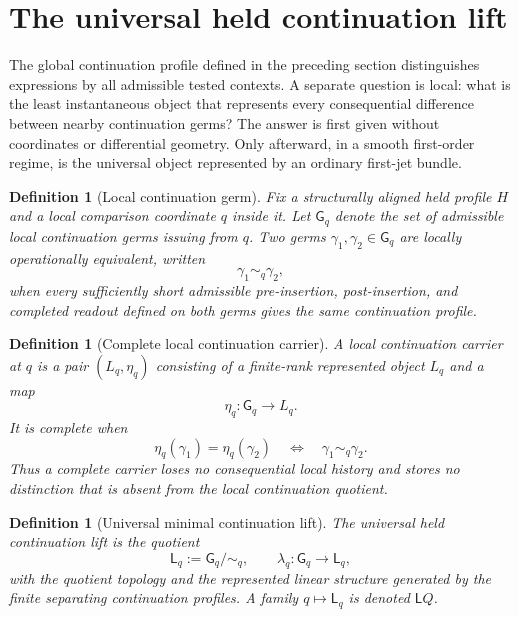 \documentclass[11pt]{article}
\newtheorem{definition}[theorem]{Definition}
\theoremstyle{remark}
\begin{document}
\section{The universal held continuation lift}\label{sec:local-continuation-closure}

The global continuation profile defined in the preceding section distinguishes expressions by all admissible tested contexts.  A separate question is local: what is the least instantaneous object that represents every consequential difference between nearby continuation germs?  The answer is first given without coordinates or differential geometry.  Only afterward, in a smooth first-order regime, is the universal object represented by an ordinary first-jet bundle.

\begin{definition}[Local continuation germ]
Fix a structurally aligned held profile $H$ and a local comparison coordinate $q$ inside it.  Let $\mathsf G_q$ denote the set of admissible local continuation germs issuing from $q$.  Two germs $\gamma_1,\gamma_2\in\mathsf G_q$ are locally operationally equivalent, written
\[
        \gamma_1\sim_q\gamma_2,
\]
when every sufficiently short admissible pre-insertion, post-insertion, and completed readout defined on both germs gives the same continuation profile.
\end{definition}

\begin{definition}[Complete local continuation carrier]
A \emph{local continuation carrier} at $q$ is a pair $(L_q,\eta_q)$ consisting of a finite-rank represented object $L_q$ and a map
\[
        \eta_q:\mathsf G_q\longrightarrow L_q.
\]
It is \emph{complete} when
\[
        \eta_q(\gamma_1)=\eta_q(\gamma_2)
        \quad\Longleftrightarrow\quad
        \gamma_1\sim_q\gamma_2.
\]
Thus a complete carrier loses no consequential local history and stores no distinction that is absent from the local continuation quotient.
\end{definition}

\begin{definition}[Universal minimal continuation lift]
The \emph{universal held continuation lift} is the quotient
\[
        \mathsf L_q:=\mathsf G_q/\!\sim_q,
        \qquad
        \lambda_q:\mathsf G_q\to\mathsf L_q,
\]
with the quotient topology and the represented linear structure generated by the finite separating continuation profiles.  A family $q\mapsto\mathsf L_q$ is denoted $\mathsf LQ$.
\end{definition}
\end{document}
